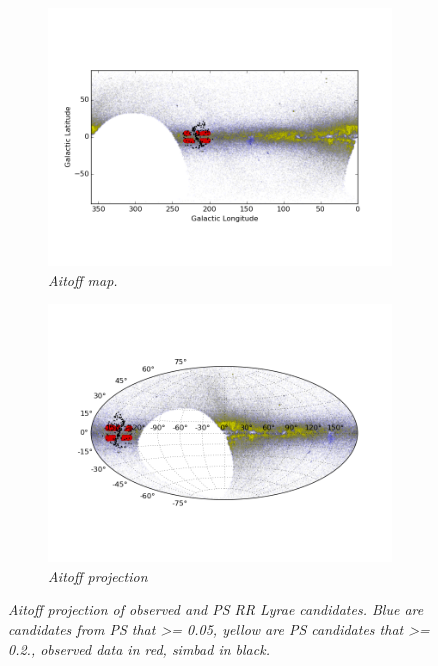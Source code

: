 \documentclass[aps,prl,twocolumn,superscriptaddress]{revtex4-1}
\begin{document}
\begin{figure}[h!]
\centering
\begin{subfigure}{.5\textwidth}
  \centering
  \includegraphics[width=1\linewidth]{figures/aitoff/simbad_alpha_is_1.png}
  \caption{\it \small{Aitoff map.}}
  \label{fig:aitoff_map_simbad}
\end{subfigure}%
\begin{subfigure}{.5\textwidth}
  \centering
  \includegraphics[width=1\linewidth]{figures/aitoff/Obs_PS_sim_lsum_aitoff_map.png}
 \caption{\it \small{Aitoff projection}}%
 \label{fig:aitoff_projection_simbad}
\end{subfigure}
\caption{\it \small{Aitoff projection of observed and PS RR Lyrae candidates.  Blue are candidates from PS that >= 0.05, yellow are PS candidates that >= 0.2., observed data in red, simbad in black.}}
\label{fig:aitoff_simbad}
\end{figure}
\end{document}
